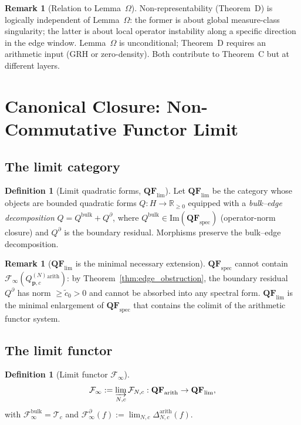 \documentclass[12pt,a4paper]{amsart}
\theoremstyle{definition}
\newtheorem{definition}[theorem]{Definition}
\newtheorem{remark}[theorem]{Remark}
\newcommand{\QM}{Q^{(N)}_{\mathbf{p},c}}
\newcommand{\Fcal}{\mathcal{F}_{N,c}}
\newcommand{\Tcal}{\mathcal{T}_c}
\newcommand{\Flim}{\mathcal{F}_{\infty}}
\newcommand{\QFlim}{\mathbf{QF}_{\lim}}
\begin{document}
\begin{remark}[Relation to Lemma~$\Omega$]
Non-representability (Theorem~D) is logically independent of
Lemma~$\Omega$: the former is about global measure-class
singularity; the latter is about local operator instability
along a specific direction in the edge window.
Lemma~$\Omega$ is unconditional; Theorem~D requires an
arithmetic input (GRH or zero-density).
Both contribute to Theorem~C but at different layers.
\end{remark}

\section{Canonical Closure: Non-Commutative Functor Limit}%
\label{sec:closure}

\subsection{The limit category}

\begin{definition}[Limit quadratic forms, $\QFlim$]%
\label{def:lim_qf}
Let $\QFlim$ be the category whose objects are bounded
quadratic forms $Q: H\to\mathbb{R}_{\ge 0}$ equipped with a
\emph{bulk--edge decomposition} $Q = Q^{\mathrm{bulk}} + Q^{\partial}$,
where $Q^{\mathrm{bulk}}\in\overline{\mathrm{Im}(\mathbf{QF}_{\mathrm{spec}})}$
(operator-norm closure) and $Q^{\partial}$ is the boundary residual.
Morphisms preserve the bulk--edge decomposition.
\end{definition}

\begin{remark}[$\QFlim$ is the minimal necessary extension]
$\mathbf{QF}_{\mathrm{spec}}$ cannot contain $\Flim(\QM^{\mathrm{arith}})$:
by Theorem~\ref{thm:edge_obstruction}, the boundary residual
$Q^{\partial}$ has norm $\ge\tilde c_0 > 0$ and cannot be absorbed
into any spectral form. $\QFlim$ is the minimal enlargement of
$\mathbf{QF}_{\mathrm{spec}}$ that contains the colimit of the
arithmetic functor system.
\end{remark}

\subsection{The limit functor}

\begin{definition}[Limit functor $\Flim$]\label{def:Flim}
\[
  \Flim := \varinjlim_{N,c}\Fcal
  :\mathbf{QF}_{\mathrm{arith}}\to\QFlim,
\]
with $\Flim^{\mathrm{bulk}} = \Tcal$
and $\Flim^{\partial}(f) := \lim_{N,c}\Delta_{N,c}^{\mathrm{arith}}(f)$.
\end{definition}
\end{document}
